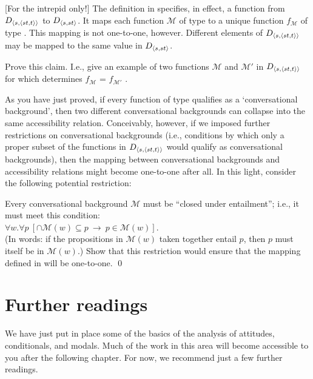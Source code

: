 \begin{exercise}\label{closure}
	
	[For the intrepid only!] The definition in  specifies, in
  effect, a function from $D_{\langle s,\langle st,t \rangle \rangle}$ to $D_{\langle s,st \rangle}$. It
  maps each function $\mathcal{M}$ of type  to a unique
  function $f_{\mathcal{M}}$ of type . This mapping is not
  one-to-one, however. Different elements of $D_{\langle s,\langle st,t \rangle \rangle}$ may be
  mapped to the same value in $D_{\langle s,st \rangle}$.

  Prove this claim. I.e., give an example of two functions $\mathcal{M}$ and
  $\mathcal{M}'$ in $D_{\langle s,\langle st,t \rangle \rangle}$ for which 
  determines $f_{\mathcal{M}}$ = $f_{\mathcal{M}'}$ .
		
  As you have just proved, if every function of type 
  qualifies as a `conversational background', then two different conversational
  backgrounds can collapse into the same accessibility relation. Conceivably,
  however, if we imposed further restrictions on conversational backgrounds
  (i.e., conditions by which only a proper subset of the functions in
  $D_{\langle s,\langle st,t \rangle \rangle}$ would qualify as conversational backgrounds), then
  the mapping between conversational backgrounds and accessibility relations
  might become one-to-one after all. In this light, consider the following
  potential restriction:

	\ex Every conversational background $\mathcal{M}$ must be ``closed under
  entailment''; i.e., it must meet this condition:\\
  $\forall w. \forall p\ [ \ensuremath{\cap}\mathcal{M}(w)
  \ensuremath{\subseteq} p\
  \rightarrow\ p \in \mathcal{M}(w) ]$.\\
  (In words: if the propositions in $\mathcal{M}(w)$ taken together entail $p$,
  then $p$ must itself be in $\mathcal{M}(w)$.) \xe
  Show that this restriction would ensure that the mapping defined in
  \refx{convers} will be one-to-one. \qed
\end{exercise} 

\section*{Further readings}

We have just put in place some of the basics of the analysis of attitudes,
conditionals, and modals. Much of the work in this area will become accessible
to you after the following chapter. For now, we recommend just a few
further readings.

